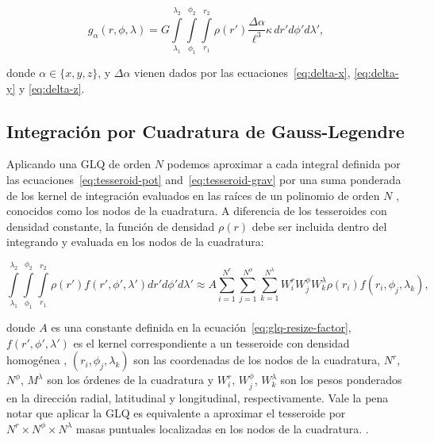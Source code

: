 \begin{equation}
    g_{\alpha}(r,\phi,\lambda) = G
    \int\limits_{\lambda_1}^{\lambda_2}
    \int\limits_{\phi_1}^{\phi_2}
    \int\limits_{r_1}^{r_2}
    \rho(r') \frac{\Delta\alpha}{\ell^3}
    \kappa \, dr' d\phi' d\lambda',
\label{eq:tesseroid-grav}
\end{equation}

\noindent donde $\alpha \in \{x, y, z\}$, y $\Delta \alpha$ vienen dados por
las ecuaciones~\ref{eq:delta-x}, \ref{eq:delta-y} y \ref{eq:delta-z}.

\subsection{Integración por Cuadratura de Gauss-Legendre}

Aplicando una \ac{GLQ} de orden $N$ podemos aproximar a cada integral definida
por las ecuaciones~\ref{eq:tesseroid-pot} and~\ref{eq:tesseroid-grav} por una
suma ponderada de los kernel de integración evaluados en las raíces de un
polinomio de orden $N$ \citep[p.~390]{hildebrand1987}, conocidos como los nodos
de la cuadratura.
A diferencia de los tesseroides con densidad constante, la función de densidad
$\rho(r)$ debe ser incluida dentro del integrando y evaluada en los nodos de la
cuadratura:

\begin{equation}
        \int\limits_{\lambda_1}^{\lambda_2}
        \int\limits_{\phi_1}^{\phi_2}
        \int\limits_{r_1}^{r_2}
        \rho(r') f(r', \phi', \lambda')
        dr' d\phi' d\lambda' \approx
        A
        \sum\limits_{i=1}^{N^r}
        \sum\limits_{j=1}^{N^\phi}
        \sum\limits_{k=1}^{N^\lambda}
        W_i^r W_j^\phi W_k^\lambda
        \rho(r_i) f(r_i, \phi_j, \lambda_k),
\label{eq:glq-var-dens}
\end{equation}

\noindent donde $A$ es una constante definida en la
ecuación~\ref{eq:glq-resize-factor}, $f(r', \phi', \lambda')$ es el kernel
correspondiente a un tesseroide con densidad homogénea \citep{grombein2013},
$(r_i, \phi_j, \lambda_k)$ son las coordenadas de los nodos de la cuadratura,
$N^r$, $N^\phi$, $M^\lambda$ son los órdenes de la cuadratura y $W_i^r$,
$W_j^\phi$, $W_k^\lambda$ son los pesos ponderados en la dirección radial,
latitudinal y longitudinal, respectivamente.
Vale la pena notar que aplicar la \ac{GLQ} es equivalente a aproximar el
tesseroide por $N^r \times N^\phi \times N^\lambda$ masas puntuales localizadas
en los nodos de la cuadratura. \citep{ku1977, asgharzadeh2007}.


